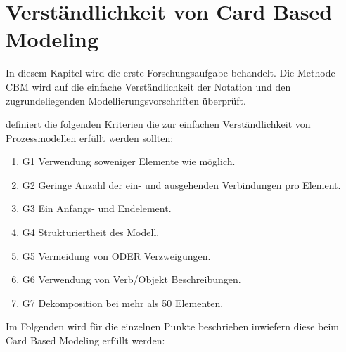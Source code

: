 %
%
% 
% 
% 


\chapter{Verständlichkeit von Card Based Modeling}
\label{chap:Empfehlungen}
In diesem Kapitel wird die erste Forschungsaufgabe behandelt. Die Methode CBM \citep{Oppl:2015:ASB:2723839.2723841} wird auf die einfache Verständlichkeit der Notation und den zugrundeliegenden Modellierungsvorschriften überprüft.

\citeauthor{MENDLING2010127} definiert die folgenden Kriterien die zur einfachen Verständlichkeit von Prozessmodellen erfüllt werden sollten:
\begin{enumerate}
	\item G1 Verwendung soweniger Elemente wie möglich.
	\item G2 Geringe Anzahl der ein- und ausgehenden Verbindungen pro Element.
	\item G3 Ein Anfangs- und Endelement.
	\item G4 Strukturiertheit des Modell.
	\item G5 Vermeidung von ODER Verzweigungen.
	\item G6 Verwendung von Verb/Objekt Beschreibungen.
	\item G7 Dekomposition bei mehr als 50 Elementen.\citep{MENDLING2010127}
\end{enumerate}

Im Folgenden wird für die einzelnen Punkte beschrieben inwiefern diese beim Card Based Modeling erfüllt werden:

